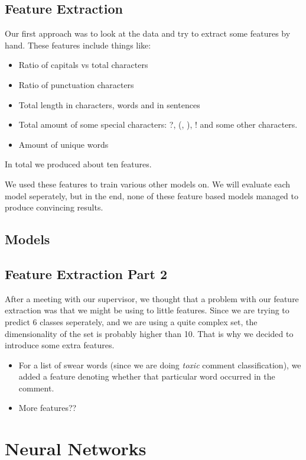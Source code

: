 \documentclass[10pt, a4paper,twocolumn]{article}
\begin{document}
	\subsection{Feature Extraction}
	Our first approach was to look at the data and try to extract some features by hand. These features include things like: 
	\begin{itemize}
		\setlength\itemsep{0px}
		\item Ratio of capitals vs total characters
		\item Ratio of punctuation characters
		\item Total length in characters, words and in sentences
		\item Total amount of some special characters: ?, (, ), ! and some other characters.
		\item Amount of unique words		
	\end{itemize}
	In total we produced about ten features.
	
	We used these features to train various other models on. We will evaluate each model seperately, but in the end, none of these feature based models managed to produce convincing results.
		\subsection{Models}
	\subsection{Feature Extraction Part 2}
	
	After a meeting with our supervisor, we thought that a problem with our feature extraction was that we might be using to little features. Since we are trying to predict 6 classes seperately, and we are using a quite complex set, the dimensionality of the set is probably higher than 10. That is why we decided to introduce some extra features.
	
	\begin{itemize}
		\item For a list of swear words (since we are doing \emph{toxic} comment classification), we added a feature denoting whether that particular word occurred in the comment.
		\item {\color{red}More features??} 
	\end{itemize}
	
	
	\section{Neural Networks}
	
\end{document}

